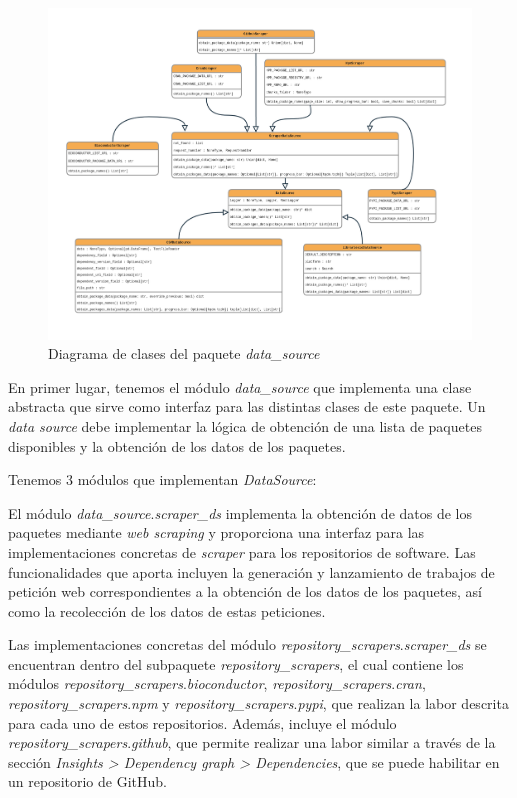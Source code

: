 \begin{figure}[h!]
    \centering
    \includegraphics[width=1.2\textwidth]{img/anexos/data_source_classes.png}
    \caption{Diagrama de clases del paquete \textit{data\_source}}
    \label{fig:data_source_classes}
\end{figure}

En primer lugar, tenemos el módulo \textit{data\_source} que implementa una clase abstracta que
sirve como interfaz para las distintas clases de este paquete. Un \textit{data source} debe implementar
la lógica de obtención de una lista de paquetes disponibles y la obtención de los datos de los paquetes.

Tenemos 3 módulos que implementan \textit{DataSource}:

El módulo \textit{data\_source}.\textit{scraper\_ds} implementa la obtención de datos de los paquetes
mediante \textit{web scraping} y proporciona una interfaz para las implementaciones concretas
de \textit{scraper} para los repositorios de software. Las funcionalidades que aporta incluyen
la generación y lanzamiento de trabajos de petición web correspondientes a la obtención de los datos
de los paquetes, así como la recolección de los datos de estas peticiones.

Las implementaciones concretas del módulo \textit{repository\_scrapers}.\textit{scraper\_ds} se encuentran
dentro del subpaquete \textit{repository\_scrapers}, el cual contiene los módulos \textit{repository\_scrapers}.\textit{bioconductor},
\textit{repository\_scrapers}.\textit{cran}, \textit{repository\_scrapers}.\textit{npm}
y \textit{repository\_scrapers}.\textit{pypi}, que realizan la labor descrita para cada uno de
estos repositorios. Además, incluye el módulo \textit{repository\_scrapers}.\textit{github}, que permite
realizar una labor similar a través de la sección \textit{Insights > Dependency graph > Dependencies}, que se puede
habilitar en un repositorio de GitHub.

